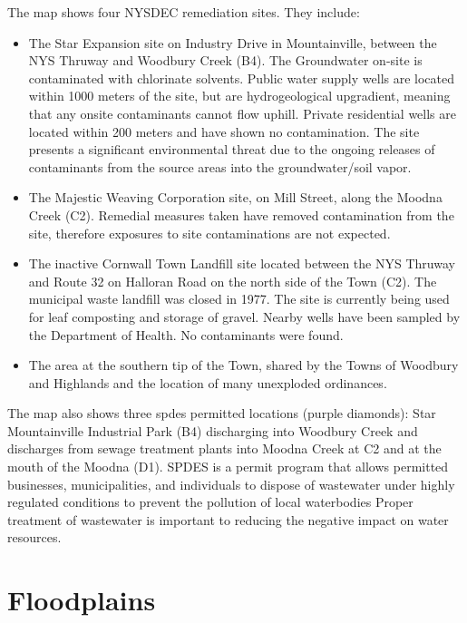 The map shows four NYSDEC remediation sites. They include:
\begin{itemize}
    \item The Star Expansion site on Industry Drive in Mountainville, between 
    the NYS Thruway and Woodbury Creek (B4). The Groundwater on-site is 
    contaminated with chlorinate solvents. Public water supply wells are 
    located within 1000 meters of the site, but are hydrogeological 
    upgradient, meaning that any onsite contaminants cannot flow 
    uphill. Private residential wells are located within 200 meters 
    and have shown no contamination. The site presents a significant 
    environmental threat due to the ongoing releases of contaminants from the 
    source areas into the groundwater/soil vapor.
    \item The Majestic Weaving Corporation site, on Mill Street, along the 
    Moodna Creek (C2). Remedial measures taken have removed contamination from 
    the site, therefore exposures to site contaminations are not expected.
    \item The inactive Cornwall Town Landfill site located between the NYS 
    Thruway and Route 32 on Halloran Road on the north side of the Town (C2). 
    The municipal waste landfill was closed in 1977. The site is currently 
    being used for leaf composting and storage of gravel. Nearby wells have 
    been sampled by the Department of Health. No contaminants were found.
    \item The area at the southern tip of the Town, shared by the Towns of 
    Woodbury and Highlands and the location of many unexploded ordinances.
\end{itemize}
The map also shows three \gls{spdes} permitted 
locations (purple diamonds): Star Mountainville Industrial Park (B4) 
discharging into Woodbury Creek and discharges from sewage treatment plants into 
Moodna Creek at C2 and at the mouth of the Moodna (D1). SPDES is a permit 
program that allows permitted businesses, municipalities, and individuals to 
dispose of wastewater under highly regulated conditions to prevent the pollution 
of local waterbodies Proper treatment of wastewater is important to reducing the 
negative impact on water resources.

\section{Floodplains}\label{subsec:floodzones}
